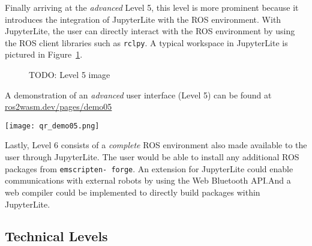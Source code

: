         Finally arriving at the \textit{advanced} Level 5, this level is more 
        prominent because it introduces the integration of JupyterLite with the 
        ROS environment. With JupyterLite, the user can directly interact with
        the ROS environment by using the ROS client libraries such as \texttt{rclpy}.
        A typical workspace in JupyterLite is pictured in Figure~\ref{fig:ui5}.

        \begin{figure}[htbp]
            \centering
            \caption{TODO: Level 5 image}\label{fig:ui5}
        \end{figure}

        \begin{tcolorbox}[title=Example 5]
            \begin{minipage}[t]{0.87\linewidth}
                \vspace*{0.5\baselineskip}
                A demonstration of an \textit{advanced} user interface (Level 5) can
                be found at \href{https://ros2wasm.dev/pages/demo05/index.html}{\textsf{ros2wasm.dev/pages/demo05}}
            \end{minipage}\hfill%
            \begin{minipage}[t]{0.1\linewidth}
                \vspace*{0pt}
                \texttt{[image: qr\_demo05.png]}
            \end{minipage}
        \end{tcolorbox}


        Lastly, Level 6 consists of a \textit{complete} ROS environment also made
        available to the user through JupyterLite. The user would be able to
        install any additional ROS packages from \texttt{emscripten- forge}. An
        extension for JupyterLite could enable communications with external robots
        by using the Web Bluetooth API.\@ And a web compiler could be implemented 
        to directly build packages within JupyterLite.


    \subsection{Technical Levels}

